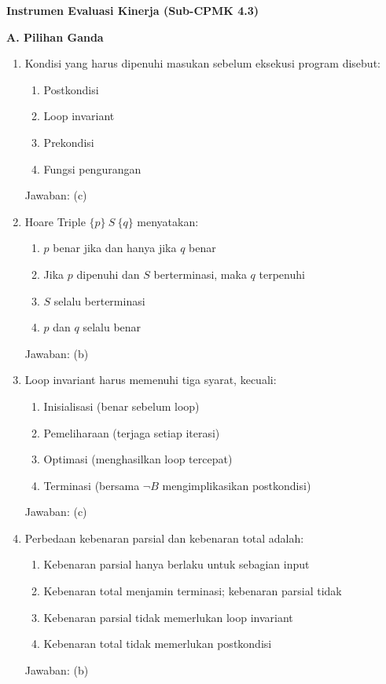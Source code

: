 \documentclass[../main]{subfiles}
\begin{document}
\begin{asesmen}
\textbf{Instrumen Evaluasi Kinerja (Sub-CPMK 4.3)}

\textbf{A. Pilihan Ganda}
\begin{enumerate}
  \item Kondisi yang harus dipenuhi masukan sebelum eksekusi program disebut:
  \begin{enumerate}
    \item Postkondisi
    \item Loop invariant
    \item Prekondisi
    \item Fungsi pengurangan
  \end{enumerate}
  Jawaban: (c)

  \item Hoare Triple $\{p\}\ S\ \{q\}$ menyatakan:
  \begin{enumerate}
    \item $p$ benar jika dan hanya jika $q$ benar
    \item Jika $p$ dipenuhi dan $S$ berterminasi, maka $q$ terpenuhi
    \item $S$ selalu berterminasi
    \item $p$ dan $q$ selalu benar
  \end{enumerate}
  Jawaban: (b)

  \item Loop invariant harus memenuhi tiga syarat, kecuali:
  \begin{enumerate}
    \item Inisialisasi (benar sebelum loop)
    \item Pemeliharaan (terjaga setiap iterasi)
    \item Optimasi (menghasilkan loop tercepat)
    \item Terminasi (bersama $\neg B$ mengimplikasikan postkondisi)
  \end{enumerate}
  Jawaban: (c)

  \item Perbedaan kebenaran parsial dan kebenaran total adalah:
  \begin{enumerate}
    \item Kebenaran parsial hanya berlaku untuk sebagian input
    \item Kebenaran total menjamin terminasi; kebenaran parsial tidak
    \item Kebenaran parsial tidak memerlukan loop invariant
    \item Kebenaran total tidak memerlukan postkondisi
  \end{enumerate}
  Jawaban: (b)


\end{enumerate}
\end{asesmen}
\end{document}
